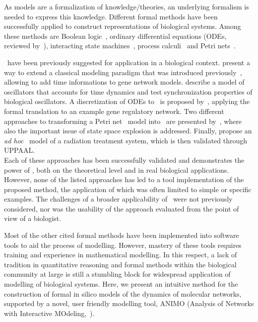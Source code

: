 As models are a formalization of knowledge/theories, an underlying formalism is needed to express
this knowledge. Different formal methods have been successfully applied to construct representations
of biological systems. Among these methods are Boolean logic~\citep{boolean-networks-flower,boolean-networks2},
ordinary differential equations (ODEs, reviewed by~\citealp[]{hidde-review}),
interacting state machines~\citep{interacting-sm1,interacting-sm2},
process calculi~\citep{blenx,bio-pepa} and Petri nets~\citep{petri-nets,petri-nets2}.

\tas\ have been previously suggested for application in a biological context.
\cite{ta-siebert} present a way to extend a classical modeling paradigm
that was introduced previously~\citep{thomas-formalism}, allowing to add time informations to gene network models.
\cite{bartocci-oscillators} describe a model of oscillators that accounts for time
dynamics and test synchronization properties of biological oscillators.
A discretization of ODEs to \tas\ is proposed by~\citet{oded-ode-ta-discretization}, applying
the formal translation to an example gene regulatory network. Two different approaches to transforming
a Petri net~\citep{petri-nets} model into \tas\ are presented by~\citet{ta-giapponesi},
where also the important issue of state space explosion is addressed.
Finally, \cite{ta-radiazioni} propose an \emph{ad hoc} \tas\ model of a radiation treatment
system, which is then validated through UPPAAL.\\
Each of these approaches has been successfully validated and demonstrates the power of \tas,
both on the theoretical level and in real biological applications. However, none of the listed approaches
has led to a tool implementation of the proposed method, the application of which was often limited to simple
or specific examples. The challenges of a broader applicability of \tas\ were not previously considered,
nor was the usability of the approach evaluated from the point of view of a biologist.

Most of the other cited formal methods have been implemented into software tools to aid the process of modelling.
However, mastery of these tools requires
training and experience in mathematical modelling. In this respect, a lack of tradition in quantitative
reasoning and formal methods within the biological community at large is still a stumbling block for
widespread application of modelling of biological systems. Here, we present an intuitive method for the
construction of formal in silico models of the dynamics of molecular networks, supported by a novel,
user friendly modelling tool, ANIMO (Analysis of Networks with Interactive MOdeling,~\citealp[]{animo-bibe}).

